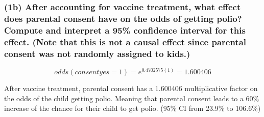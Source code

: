 \documentclass[
]{article}
\begin{document}
\hypertarget{b-after-accounting-for-vaccine-treatment-what-effect-does-parental-consent-have-on-the-odds-of-getting-polio-compute-and-interpret-a-95-confidence-interval-for-this-effect.-note-that-this-is-not-a-causal-effect-since-parental-consent-was-not-randomly-assigned-to-kids.}{%
\subsubsection{(1b) After accounting for vaccine treatment, what effect
does parental consent have on the odds of getting polio? Compute and
interpret a 95\% confidence interval for this effect. (Note that this is
not a causal effect since parental consent was not randomly assigned to
kids.)}\label{b-after-accounting-for-vaccine-treatment-what-effect-does-parental-consent-have-on-the-odds-of-getting-polio-compute-and-interpret-a-95-confidence-interval-for-this-effect.-note-that-this-is-not-a-causal-effect-since-parental-consent-was-not-randomly-assigned-to-kids.}}

\[odds(consentyes = 1) = e^{0.4702575(1)} = 1.600406\]

After vaccine treatment, parental consent has a 1.600406 multiplicative
factor on the odds of the child getting polio. Meaning that parental
consent leads to a 60\% increase of the chance for their child to get
polio. (95\% CI from 23.9\% to 106.6\%)
\end{document}
